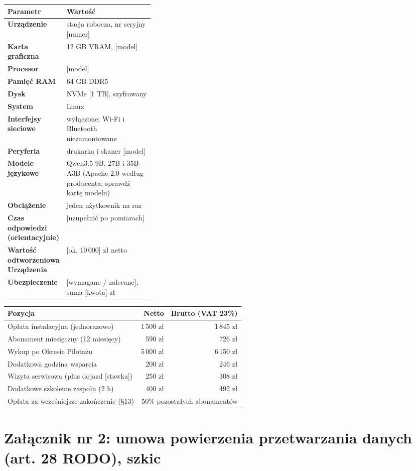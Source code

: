 \documentclass[11pt,a4paper]{article}
\begin{document}
\begin{tabularx}{\linewidth}{@{}>{\bfseries}p{0.34\linewidth}X@{}}
\toprule
Parametr & Wartość \\
\midrule
Urządzenie & stacja robocza, nr seryjny [numer] \\
Karta graficzna & 12 GB VRAM, [model] \\
Procesor & [model] \\
Pamięć RAM & 64 GB DDR5 \\
Dysk & NVMe [1 TB], szyfrowany \\
System & Linux \\
Interfejsy sieciowe & wyłączone; Wi-Fi i Bluetooth niezamontowane \\
Peryferia & drukarka i skaner [model] \\
Modele językowe & Qwen3.5 9B, 27B i 35B-A3B (Apache 2.0 według producenta; sprawdź kartę modelu) \\
Obciążenie & jeden użytkownik na raz \\
Czas odpowiedzi (orientacyjnie) & [uzupełnić po pomiarach] \\
Wartość odtworzeniowa Urządzenia & [ok. 10\,000] zł netto \\
Ubezpieczenie & [wymagane / zalecane], suma [kwota] zł \\
\bottomrule
\end{tabularx}

\vspace{0.6cm}
\begin{tabularx}{\linewidth}{@{}Xrr@{}}
\toprule
Pozycja & Netto & Brutto (VAT 23\%) \\
\midrule
Opłata instalacyjna (jednorazowo) & 1\,500 zł & 1\,845 zł \\
Abonament miesięczny (12 miesięcy) & 590 zł & 726 zł \\
Wykup po Okresie Pilotażu & 5\,000 zł & 6\,150 zł \\
Dodatkowa godzina wsparcia & 200 zł & 246 zł \\
Wizyta serwisowa (plus dojazd [stawka]) & 250 zł & 308 zł \\
Dodatkowe szkolenie zespołu (2 h) & 400 zł & 492 zł \\
Opłata za wcześniejsze zakończenie (§13) & \multicolumn{2}{r}{50\% pozostałych abonamentów} \\
\bottomrule
\end{tabularx}

\clearpage
\section*{Załącznik nr 2: umowa powierzenia przetwarzania danych (art. 28 RODO), szkic}
\end{document}
